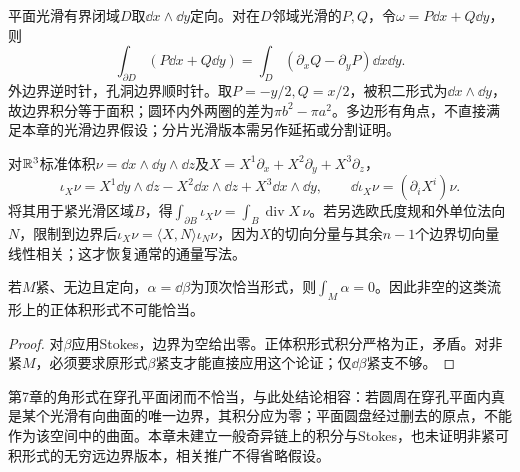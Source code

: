 \begin{example}[从Stokes恢复Green公式]
平面光滑有界闭域$D$取$\dd x\wedge\dd y$定向。对在$D$邻域光滑的$P,Q$，令$\omega=P\dd x+Q\dd y$，则
\[
 \int_{\partial D}(P\dd x+Q\dd y)
 =\int_D(\partial_xQ-\partial_yP)\dd x\dd y.
\]
外边界逆时针，孔洞边界顺时针。取$P=-y/2,Q=x/2$，被积二形式为$\dd x\wedge\dd y$，故边界积分等于面积；圆环内外两圈的差为$\pi b^2-\pi a^2$。多边形有角点，不直接满足本章的光滑边界假设；分片光滑版本需另作延拓或分割证明。
\end{example}

\begin{example}[三维通量与散度]
对$\mathbb{R}^3$标准体积$\nu=\dd x\wedge\dd y\wedge\dd z$及$X=X^1\partial_x+X^2\partial_y+X^3\partial_z$，
\[
 \iota_X\nu=X^1\dd y\wedge\dd z-X^2\dd x\wedge\dd z+X^3\dd x\wedge\dd y,
 \qquad \dd\iota_X\nu=(\partial_iX^i)\nu.
\]
将其用于紧光滑区域$B$，得$\int_{\partial B}\iota_X\nu=\int_B\operatorname{div}X\,\nu$。若另选欧氏度规和外单位法向$N$，限制到边界后$\iota_X\nu=\langle X,N\rangle\iota_N\nu$，因为$X$的切向分量与其余$n-1$个边界切向量线性相关；这才恢复通常的通量写法。
\end{example}

\begin{corollary}[无边紧流形上的恰当形式]\label{cor:exact-integral-zero}
若$M$紧、无边且定向，$\alpha=\dd\beta$为顶次恰当形式，则$\int_M\alpha=0$。因此非空的这类流形上的正体积形式不可能恰当。
\end{corollary}
\begin{proof}
对$\beta$应用Stokes，边界为空给出零。正体积形式积分严格为正，矛盾。对非紧$M$，必须要求原形式$\beta$紧支才能直接应用这个论证；仅$\dd\beta$紧支不够。
\end{proof}
第7章的角形式在穿孔平面闭而不恰当，与此处结论相容：若圆周在穿孔平面内真是某个光滑有向曲面的唯一边界，其积分应为零；平面圆盘经过删去的原点，不能作为该空间中的曲面。本章未建立一般奇异链上的积分与Stokes，也未证明非紧可积形式的无穷远边界版本，相关推广不得省略假设。
